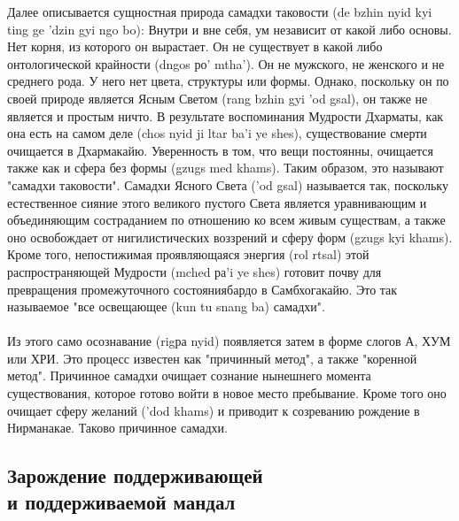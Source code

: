 Далее описывается сущностная природа самадхи таковости (de bzhin nyid kyi ting ge 'dzin
gyi ngo bo): Внутри и вне себя, ум независит от какой либо основы. Нет корня, из которого
он вырастает. Он не существует в какой либо онтологической крайности (dngos ро' mtha'). Он
не мужского, не женского и не среднего рода. У него нет цвета, структуры или формы.
Однако, поскольку он по своей природе является Ясным Светом (rang bzhin gyi 'od gsal), он
также не является и простым ничто. В результате воспоминания Мудрости Дхарматы, как
она есть на самом деле (chos nyid ji ltar ba'i ye shes), существование смерти очищается в
Дхармакайю. Уверенность в том, что вещи постоянны, очищается также как и сфера без
формы (gzugs med khams). Таким образом, это называют "самадхи таковости".
Самадхи Ясного Света ('od gsal) называется так, поскольку естественное сияние этого
великого пустого Света является уравнивающим и объединяющим состраданием по
отношению ко всем живым существам, а также оно освобождает от нигилистических
воззрений и сферу форм (gzugs kyi khams). Кроме того, непостижимая проявляющаяся
энергия (rol rtsal) этой распространяющей Мудрости (mched ра'i ye shes) готовит почву для
превращения промежуточного состояниябардо в Самбхогакайю. Это так называемое "все
освещающее (kun tu snang ba) самадхи".\\
\\
Из этого само осознавание (rigра nyid) появляется затем в форме слогов А, ХУМ или
ХРИ. Это процесс известен как "причинный метод", а также "коренной метод". Причинное
самадхи очищает сознание нынешнего момента существования, которое готово войти в
новое место пребывание. Кроме того оно очищает сферу желаний ('dod khams) и приводит к
созреванию рождение в Нирманакае. Таково причинное самадхи.

\subsection{Зарождение поддерживающей \\ и поддерживаемой мандал}

